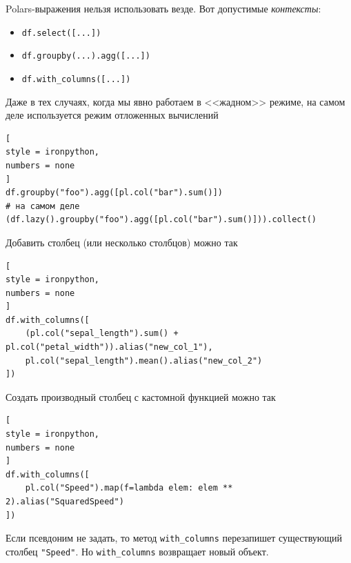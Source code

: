 \documentclass[%
	11pt,
	a4paper,
	utf8,
		]{article}
\begin{document}
Polars-выражения нельзя использовать везде. Вот допустимые \emph{контексты}:
\begin{itemize}
	\item \verb*|df.select([...])|
	
	\item \verb*|df.groupby(...).agg([...])|
	
	\item \verb*|df.with_columns([...])|
\end{itemize}

Даже в тех случаях, когда мы явно работаем в <<жадном>> режиме, на самом деле используется режим отложенных вычислений
\begin{lstlisting}[
style = ironpython,
numbers = none
]
df.groupby("foo").agg([pl.col("bar").sum()])
# на самом деле
(df.lazy().groupby("foo").agg([pl.col("bar").sum()])).collect()
\end{lstlisting}

Добавить столбец (или несколько столбцов) можно так
\begin{lstlisting}[
style = ironpython,
numbers = none
]
df.with_columns([
    (pl.col("sepal_length").sum() + pl.col("petal_width")).alias("new_col_1"),
    pl.col("sepal_length").mean().alias("new_col_2")
])
\end{lstlisting}

Создать производный столбец с кастомной функцией можно так
\begin{lstlisting}[
style = ironpython,
numbers = none
]
df.with_columns([
    pl.col("Speed").map(f=lambda elem: elem ** 2).alias("SquaredSpeed")
])
\end{lstlisting}

Если псевдоним не задать, то метод \verb*|with_columns| перезапишет существующий столбец \texttt{"Speed"}. Но \verb*|with_columns| возвращает новый объект.

\end{document}
